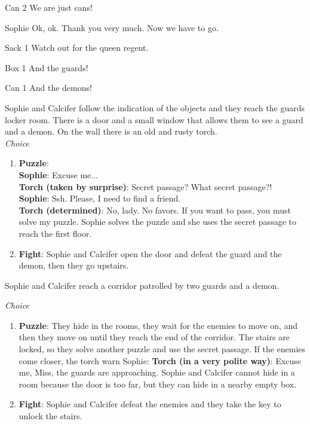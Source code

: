\begin{screenplay}
\begin{dialogue}{Can 2}
We are just cans!
\end{dialogue}
\begin{dialogue}{Sophie}
Ok, ok. Thank you very much. Now we have to go.
\end{dialogue}
\begin{dialogue}{Sack 1}
Watch out for the queen regent.
\end{dialogue}
\begin{dialogue}{Box 1}
And the guards!
\end{dialogue}
\begin{dialogue}{Can 1}
And the demons!
\end{dialogue}
\end{screenplay}


\noindent Sophie and Calcifer follow the indication of the objects and they reach the guards locker room. There is a door and a small window that allows them to see a guard and a demon. On the wall there is an old and rusty torch.\\

\textit{Choice}
\begin{enumerate}
  \item \textbf{Puzzle}:\\
    \textbf{Sophie}: Excuse me...\\
    \textbf{Torch (taken by surprise)}: Secret passage? What secret passage?!\\
    \textbf{Sophie}: Ssh. Please, I need to find a friend. \\
    \textbf{Torch (determined)}: No, lady. No favors. If you want to pass, you must solve my puzzle.
    Sophie solves the puzzle and she uses the secret passage to reach the first floor.

  \item \textbf{Fight}: Sophie and Calcifer open the door and defeat the guard and the demon, then they go upstairs.
\end{enumerate}


Sophie and Calcifer reach a corridor patrolled by two guards and a demon.

\textit{Choice}
\begin{enumerate}
  \item \textbf{Puzzle}: They hide in the rooms, they wait for the enemies to move on, and then they move on until they reach the end of the corridor. The stairs are locked, so they solve another puzzle and use the secret passage.
  If the enemies come closer, the torch warn Sophie:
  \textbf{Torch (in a very polite way)}: Excuse me, Miss, the guards are approaching.
  Sophie and Calcifer cannot hide in a room because the door is too far, but they can hide in a nearby empty box.

  \item \textbf{Fight}: Sophie and Calcifer defeat the enemies and they take the key to unlock the stairs.
\end{enumerate}

